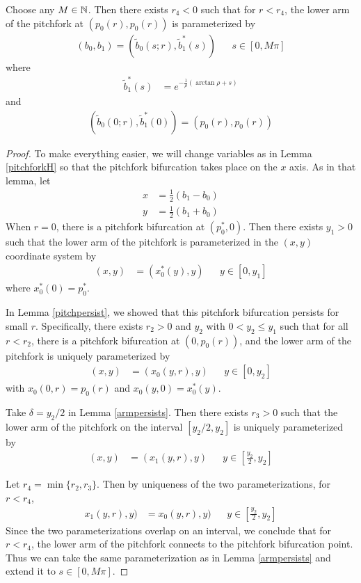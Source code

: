 \documentclass[thesis.tex]{subfiles}
\begin{document}
\begin{lemma}\label{pitchforkconnects}
Choose any $M \in \mathbb{N}$. Then there exists $r_4 < 0$ such that for $r < r_4$, the lower arm of the pitchfork at $(p_0(r), p_0(r))$ is parameterized by
\begin{align*}
(b_0, b_1) = (\tilde{b}_0(s; r), \tilde{b}^*_1(s)) && s \in [0, M \pi]
\end{align*}
where
\begin{align*}
\tilde{b}_1^*(s) &= e^{-\frac{1}{\rho}(\arctan \rho +s)} 
\end{align*}
and 
\begin{align*}
(\tilde{b}_0(0; r), \tilde{b}^*_1(0)) = (p_0(r), p_0(r))
\end{align*}

\begin{proof}
To make everything easier, we will change variables as in Lemma \ref{pitchforkH} so that the pitchfork bifurcation takes place on the $x$ axis. As in that lemma, let 
\begin{align*}
x &= \frac{1}{2}(b_1 - b_0) \\
y &= \frac{1}{2}(b_1 + b_0)
\end{align*}
When $r = 0$, there is a pitchfork bifurcation at $(p_0^*, 0)$. Then there exists $y_1 > 0$ such that the lower arm of the pitchfork is parameterized in the $(x,y)$ coordinate system by 
\begin{align*}
(x, y) &= (x_0^*(y), y) && y \in [0, y_1]
\end{align*}
where $x_0^*(0) = p_0^*$. 

In Lemma \ref{pitchpersist}, we showed that this pitchfork bifurcation persists for small $r$. Specifically, there exists $r_2 > 0$ and $y_2$ with $0 < y_2 \leq y_1$ such that for all $r < r_2$, there is a pitchfork bifurcation at $(0, p_0(r))$, and the lower arm of the pitchfork is uniquely parameterized by
\begin{align*}
(x, y) &= (x_0(y, r), y) && y \in [0, y_2]
\end{align*}
with $x_0(0, r) = p_0(r)$ and $x_0(y, 0) = x_0^*(y)$. 

Take $\delta = y_2/2$ in Lemma \ref{armpersists}. Then there exists $r_3 > 0$ such that the lower arm of the pitchfork on the interval $[y_2/2, y_2]$ is uniquely parameterized by 
\begin{align*}
(x, y) &= (x_1(y, r), y) && y \in \left[\frac{y_2}{2}, y_2\right]
\end{align*}

Let $r_4 = \min\{ r_2, r_3 \}$. Then by uniqueness of the two parameterizations, for $r < r_4$,
\begin{align*}
x_1(y, r), y) &= x_0(y, r), y) && y \in \left[\frac{y_2}{2}, y_2\right]
\end{align*}
Since the two parameterizations overlap on an interval, we conclude that for $r < r_4$, the lower arm of the pitchfork connects to the pitchfork bifurcation point. Thus we can take the same parameterization as in Lemma \ref{armpersists} and extend it to $s \in [0, M \pi]$.
\end{proof}
\end{lemma}
\end{document}
